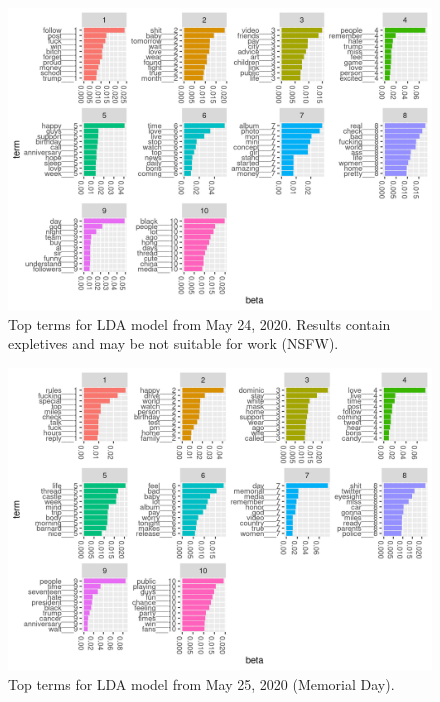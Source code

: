\documentclass[
]{article}
\begin{document}
\begin{figure}
\includegraphics[width=29.17in]{../results/beta-2020-05-24} \caption{Top terms for LDA model from May 24, 2020. Results contain expletives and may be not suitable for work (NSFW).}\label{fig:may24}
\end{figure}

\begin{figure}
\includegraphics[width=29.17in]{../results/beta-2020-05-25} \caption{Top terms for LDA model from May 25, 2020 (Memorial Day).}\label{fig:may25}
\end{figure}
\end{document}
